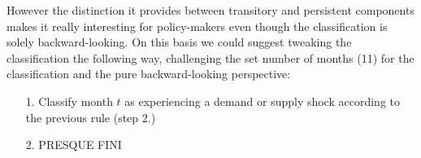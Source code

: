 However the distinction it provides between transitory and persistent components makes it really interesting for policy-makers even though the classification is solely backward-looking.
\bigbreak
On this basis we could suggest tweaking the classification the following way, challenging the set number of months (11) for the classification and the pure backward-looking perspective:
\begin{itemize}
    \item[1.] Classify month $t$ as experiencing a demand or supply shock according to the previous rule (step 2.) 
    \item[2.] PRESQUE FINI
\end{itemize}


\clearpage